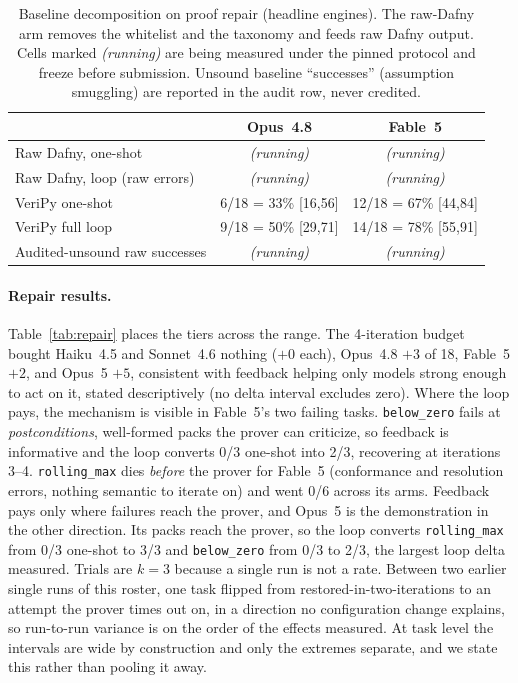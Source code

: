 \documentclass{article}
\newcommand{\toolname}{VeriPy}
\newcommand{\ehaiku}{Haiku~4.5}
\newcommand{\esonnet}{Sonnet~4.6}
\newcommand{\eopus}{Opus~4.8}
\newcommand{\efable}{Fable~5}
\newcommand{\pending}{\textit{(running)}}
\begin{document}
\begin{table}[t]
\centering
\caption{Baseline decomposition on proof repair (headline engines). The
raw-Dafny arm removes the whitelist and the taxonomy and feeds raw Dafny
output. Cells marked \pending{} are being measured under the pinned
protocol and freeze before submission. Unsound baseline ``successes''
(assumption smuggling) are reported in the audit row, never credited.}
\label{tab:baseline}
\small
\begin{tabular}{lcc}
\toprule
 & \eopus & \efable \\
\midrule
Raw Dafny, one-shot & \pending & \pending \\
Raw Dafny, loop (raw errors) & \pending & \pending \\
\toolname{} one-shot & 6/18 = 33\% [16,56] & 12/18 = 67\% [44,84] \\
\toolname{} full loop & 9/18 = 50\% [29,71] & 14/18 = 78\% [55,91] \\
\midrule
Audited-unsound raw successes & \pending & \pending \\
\bottomrule
\end{tabular}
\end{table}

\paragraph{Repair results.} Table~\ref{tab:repair} places the tiers
across the range. The 4-iteration budget bought \ehaiku{} and \esonnet{}
nothing ($+0$ each), \eopus{} $+3$ of 18, \efable{} $+2$, and Opus~5
$+5$, consistent with feedback helping only models strong enough to act
on it, stated descriptively (no delta interval excludes zero). Where the
loop pays, the mechanism is visible in \efable{}'s two failing tasks.
\texttt{below\_zero} fails at \emph{postconditions}, well-formed packs
the prover can criticize, so feedback is informative and the loop
converts 0/3 one-shot into 2/3, recovering at iterations 3--4.
\texttt{rolling\_max} dies \emph{before} the prover for \efable{}
(conformance and resolution errors, nothing semantic to iterate on) and
went 0/6 across its arms. Feedback pays only where failures reach the
prover, and Opus~5 is the demonstration in the other direction. Its
packs reach the prover, so the loop converts \texttt{rolling\_max} from
0/3 one-shot to 3/3 and \texttt{below\_zero} from 0/3 to 2/3, the
largest loop delta measured. Trials are
$k{=}3$ because a single run is not a rate. Between two earlier single
runs of this roster, one task flipped from restored-in-two-iterations to
an attempt the prover times out on, in a direction no configuration change
explains, so run-to-run variance is on the order of the effects measured.
At task level the intervals are wide by construction and only the extremes
separate, and we state this rather than pooling it away.
\end{document}

